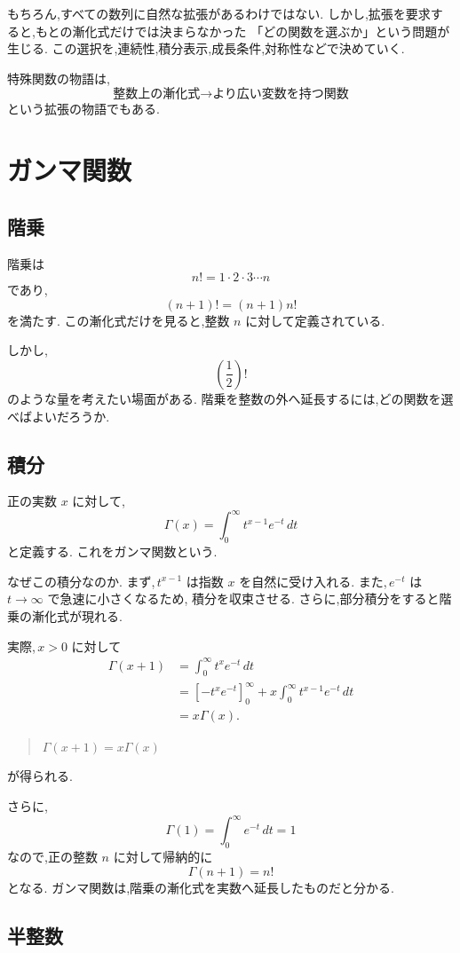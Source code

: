 もちろん,すべての数列に自然な拡張があるわけではない.
しかし,拡張を要求すると,もとの漸化式だけでは決まらなかった
「どの関数を選ぶか」という問題が生じる.
この選択を,連続性,積分表示,成長条件,対称性などで決めていく.

特殊関数の物語は,
\[
  \text{整数上の漸化式}
  \longrightarrow
  \text{より広い変数を持つ関数}
\]
という拡張の物語でもある.

\section{ガンマ関数}

\subsection{階乗}

階乗は
\[
  n!=1\cdot2\cdot3\cdots n
\]
であり,
\[
  (n+1)!=(n+1)n!
\]
を満たす.
この漸化式だけを見ると,整数 $n$ に対して定義されている.

しかし,
\[
  \left(\frac12\right)!
\]
のような量を考えたい場面がある.
階乗を整数の外へ延長するには,どの関数を選べばよいだろうか.

\subsection{積分}

正の実数 $x$ に対して,
\[
  \Gamma(x)=\int_0^\infty t^{x-1}e^{-t}\,dt
\]
と定義する.
これをガンマ関数という.

なぜこの積分なのか.
まず,\,$t^{x-1}$ は指数 $x$ を自然に受け入れる.
また,\,$e^{-t}$ は $t\to\infty$ で急速に小さくなるため,
積分を収束させる.
さらに,部分積分をすると階乗の漸化式が現れる.

実際,\,$x>0$ に対して
\[
\begin{align*}
  \Gamma(x+1)
  &=\int_0^\infty t^x e^{-t}\,dt\\
  &=\left[-t^xe^{-t}\right]_0^\infty
    +x\int_0^\infty t^{x-1}e^{-t}\,dt\\
  &=x\Gamma(x).
\end{align*}
\]
\begin{quote}
  $\Gamma(x+1)=x\Gamma(x)$
\end{quote}
が得られる.

さらに,
\[
  \Gamma(1)=\int_0^\infty e^{-t}\,dt=1
\]
なので,正の整数 $n$ に対して帰納的に
\[
  \Gamma(n+1)=n!
\]
となる.
ガンマ関数は,階乗の漸化式を実数へ延長したものだと分かる.

\subsection{半整数}

